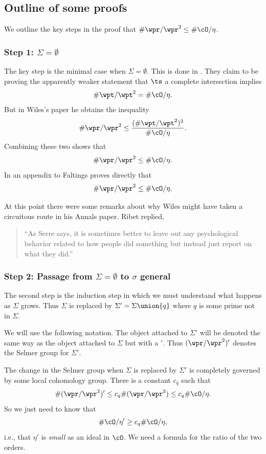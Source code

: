 \documentclass{report}
\begin{document}
\subsection{Outline of some proofs}
We outline the key steps in the proof that
$\#\wpr/\wpr^2\leq \#\cO/\eta$.
\subsubsection{Step 1: $\Sigma=\emptyset$}
The key step is the minimal case when $\Sigma=\emptyset$.
This is done in \cite{taylor-wiles:fermat}.
They claim to be proving the apparently weaker statement
that $\ts$ a complete intersection implies
$$\#\wpt/\wpt^2=\#\cO/\eta.$$
But in Wiles's paper \cite{wiles:fermat} he obtains the inequality
$$\#\wpr/\wpr^2 \leq \frac{(\#\wpt/\wpt^2)^2}{\#\cO/\eta}.$$
Combining these two shows that
$$\#\wpr/\wpr^2\leq \#\cO/\eta.$$
In an appendix to \cite{taylor-wiles:fermat} Faltings proves directly that
$$\#\wpr/\wpr^2\leq\#\cO/\eta.$$

At this point there were some remarks about why Wiles might
have taken a circuitous route in his Annals paper.
Ribet replied,
\begin{quote}
``As Serre says, it is sometimes better to leave out any
psychological behavior related to how people did something
but instead just report on what they did.''
\end{quote}

\subsubsection{Step 2: Passage from $\Sigma=\emptyset$ to $\sigma$ general}
The second step is the induction step in which
we must understand what happens as $\Sigma$ grows.
Thus $\Sigma$ is replaced by $\Sigma'=\Sigma\union\{q\}$
where $q$ is some prime not in $\Sigma$.

We will use the following notation. The object attached to
$\Sigma'$ will be denoted the same way as the object attached
to $\Sigma$ but with a $'$. Thus $(\wpr/\wpr^2)'$ denotes the
Selmer group for $\Sigma'$.

The change in the Selmer group when $\Sigma$ is replaced
by $\Sigma'$ is completely governed by some local cohomology group.
There is a constant $c_q$ such that
$$\#(\wpr/\wpr^2)'\leq c_q\#(\wpr/\wpr^2)\leq c_q\#\cO/\eta.$$
So we just need to know that $$\#\cO/\eta'\geq c_q \#\cO/\eta,$$
i.e., that $\eta'$ is {\em small} as an ideal in $\cO$.
We need a formula for the ratio of the two orders.
\end{document}
